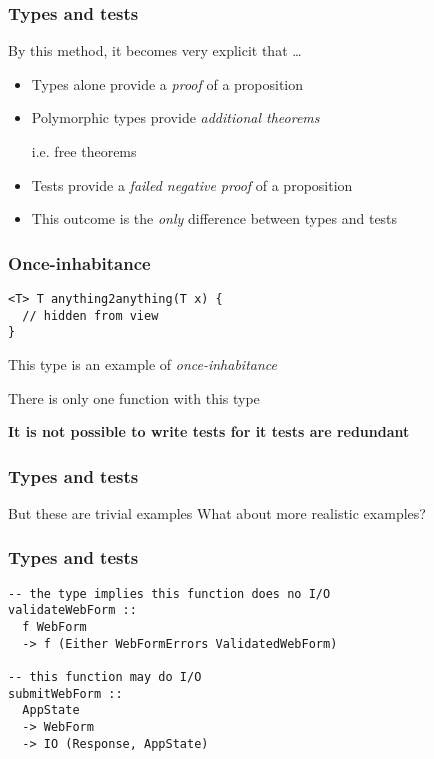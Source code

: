 \begin{frame}[fragile]
\frametitle{Types and tests}
\begin{block}{By this method, it becomes very explicit that \ldots}
\begin{itemize}
\item Types alone provide a \emph{proof} of a proposition
\item Polymorphic types provide \emph{additional theorems}
      
      i.e. free theorems
\item Tests provide a \emph{failed negative proof} of a proposition
\item This outcome is the \emph{only} difference between types and tests
\end{itemize}
\end{block}
\end{frame}

\begin{frame}[fragile]
\frametitle{Once-inhabitance}
\begin{block}{}
\begin{lstlisting}[style=haskell]
<T> T anything2anything(T x) {
  // hidden from view 
}
\end{lstlisting}
\end{block}
\begin{center}
This type is an example of \emph{once-inhabitance}

There is only one function with this type

\textbf{It is not possible to write tests for it \textemdash tests are redundant}
\end{center}
\end{frame}



\begin{frame}[fragile]
\frametitle{Types and tests}
\begin{block}{But these are trivial examples}
What about more realistic examples?
\end{block}
\end{frame}

\begin{frame}[fragile]
\frametitle{Types and tests}
\begin{block}{}
\begin{lstlisting}[style=haskell]
-- the type implies this function does no I/O
validateWebForm ::
  f WebForm
  -> f (Either WebFormErrors ValidatedWebForm)

-- this function may do I/O
submitWebForm ::
  AppState
  -> WebForm
  -> IO (Response, AppState)
\end{lstlisting}
\end{block}
\end{frame}

